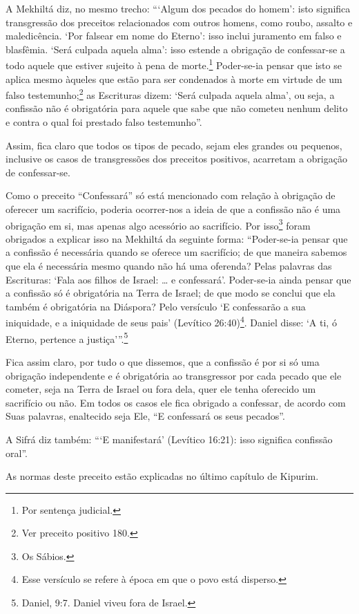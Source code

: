 A Mekhiltá diz, no mesmo trecho: ```Algum dos pecados do homem': isto
significa transgressão dos preceitos relacionados com outros homens,
como roubo, assalto e maledicência. `Por falsear em nome do Eterno':
isso inclui juramento em falso e blasfêmia. `Será culpada aquela alma': isso estende a obrigação de confessar-se a todo aquele que estiver
sujeito à pena de morte.\footnote{Por sentença judicial.} Poder-se-ia pensar que
isto se aplica mesmo àqueles que estão para ser condenados à morte em
virtude de um falso testemunho;\footnote{Ver preceito positivo 180.} as Escrituras
dizem: `Será culpada aquela alma', ou seja, a confissão não é obrigatória para
aquele que sabe que não cometeu nenhum delito e contra o qual foi prestado falso
testemunho''.

Assim, fica claro que todos os tipos de pecado, sejam eles grandes ou
pequenos, inclusive os casos de transgressões dos preceitos positivos,
acarretam a obrigação de confessar-se.

Como o preceito ``Confessará'' só está mencionado com relação à
obrigação de oferecer um sacrifício, poderia ocorrer-nos a ideia de que
a confissão não é uma obrigação em si, mas apenas algo acessório ao
sacrifício. Por isso\footnote{Os Sábios.} foram obrigados a explicar
isso na Mekhiltá da seguinte forma: ``Poder-se-ia pensar que a
confissão é necessária quando se oferece um sacrifício; de
que maneira sabemos que ela é necessária mesmo quando não há uma
oferenda? Pelas palavras das Escrituras: `Fala aos filhos de Israel: \ldots{} e confessará'. Poder-se-ia ainda pensar que a confissão só é
obrigatória na Terra de Israel; de que modo se conclui que ela também é
obrigatória na Diáspora? Pelo versículo `E confessarão a sua iniquidade, e a iniquidade de seus pais' (Levítico 26:40)\footnote{Esse versículo se refere à época em que o povo está disperso.}. Daniel disse: `A ti, ó Eterno, pertence a justiça'''.\footnote{Daniel, 9:7. Daniel viveu fora de Israel.}

Fica assim claro, por tudo o que dissemos, que a confissão é por si
só uma obrigação independente e é obrigatória ao transgressor por cada
pecado que ele cometer, seja na Terra de Israel ou fora dela, quer ele
tenha oferecido um sacrifício ou não. Em todos os casos ele fica
obrigado a confessar, de acordo com Suas palavras, enaltecido seja Ele,
``E confessará os seus pecados''.

A Sifrá diz também: ```E manifestará' (Levítico 16:21): isso significa confissão oral''.

As normas deste preceito estão explicadas no último capítulo de Kipurim.

